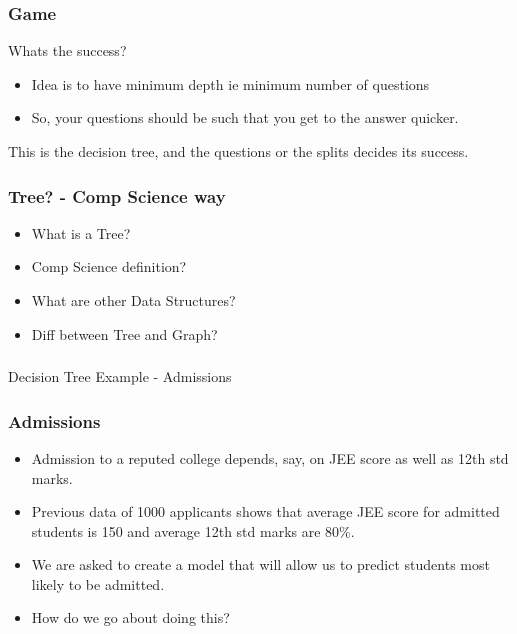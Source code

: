\begin{frame}[fragile]\frametitle{Game}
Whats the success?
\begin{itemize}
	\item Idea is to have minimum depth ie minimum number of questions
	\item So, your questions should be such that you get to the answer quicker.
	\end{itemize}
This is the decision tree, and the questions or the splits decides its success.
\end{frame}

\begin{frame}[fragile]\frametitle{Tree? - Comp Science way}
\begin{itemize}
	\item What is a Tree?
	\item Comp Science definition?
	\item What are other Data Structures?
	\item Diff between Tree and Graph?
	\end{itemize}
\end{frame}

\begin{frame}[fragile]\frametitle{}
\begin{center}
{\Large Decision Tree Example - Admissions}
\end{center}
\end{frame}

\begin{frame}[fragile]\frametitle{Admissions}
\begin{itemize}
	\item Admission to a reputed college depends, say, on JEE score as well as 12th std marks.
	\item Previous data of 1000 applicants shows that average JEE score for admitted students is 150 and average 12th std marks are 80\%. 
	\item We are asked to create a model that will allow us to predict students most likely to be admitted. 
	\item How do we go about doing this?
	\end{itemize}
\end{frame}

